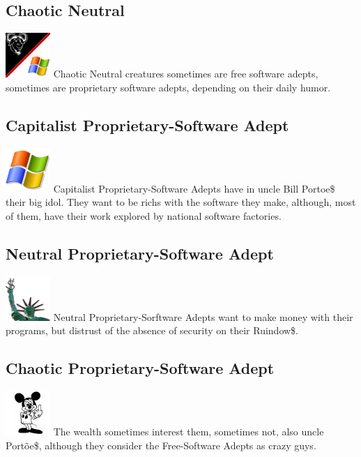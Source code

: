\documentclass[ letterpaper,12pt]{article}
\begin{document}
\subsection{Chaotic Neutral} \includegraphics{../data/alignment/Img/yang.png} Chaotic Neutral creatures sometimes are free software adepts, sometimes are proprietary software adepts, depending on their daily humor.

\subsection{Capitalist Proprietary-Software Adept}\includegraphics{../data/alignment/Img/ruindows.png} Capitalist Proprietary-Software Adepts have in uncle Bill Portoe\$ their big idol. They want to be richs with the software they make, although, most of them, have their work explored by national software factories.

\subsection{Neutral Proprietary-Software Adept} \includegraphics{../data/alignment/Img/cifrao.png} Neutral Proprietary-Sorftware Adepts want to make money with their programs, but distrust of the absence of security on their Ruindow\$.

\subsection{Chaotic Proprietary-Software Adept}\includegraphics{../data/alignment/Img/niquel.png} The wealth sometimes interest them, sometimes not, also uncle Portõe\$, although they consider the Free-Software Adepts as crazy guys.
\end{document}
